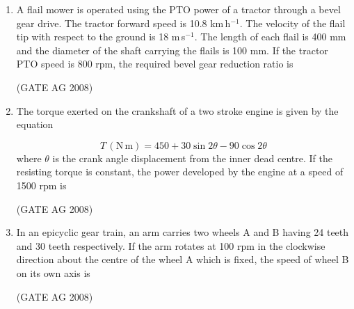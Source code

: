 \documentclass[journal,12pt,onecolumn]{IEEEtran}
\begin{document}
\begin{enumerate}
\medskip

\item 
 A flail mower is operated using the PTO power of a tractor through a bevel gear drive. The tractor forward speed is 10.8 km\,h$^{-1}$. The velocity of the flail tip with respect to the ground is 18 m\,s$^{-1}$. The length of each flail is 400 mm and the diameter of the shaft carrying the flails is 100 mm. If the tractor PTO speed is 800 rpm, the required bevel gear reduction ratio is
\begin{enumerate}
\end{enumerate}
\hfill(GATE AG 2008)\\

\medskip

\item 
 The torque exerted on the crankshaft of a two stroke engine is given by the equation

\[T \, (\mathrm{N\,m}) = 450 + 30 \sin 2\theta - 90 \cos 2\theta\]
where $\theta$ is the crank angle displacement from the inner dead centre. If the resisting torque is constant, the power developed by the engine at a speed of 1500 rpm is
\begin{enumerate}
\end{enumerate}
\hfill(GATE AG 2008)\\

\medskip

\item 
 In an epicyclic gear train, an arm carries two wheels A and B having 24 teeth and 30 teeth respectively. If the arm rotates at 100 rpm in the clockwise direction about the centre of the wheel A which is fixed, the speed of wheel B on its own axis is
\begin{enumerate}
\end{enumerate}
\hfill(GATE AG 2008)\\


\end{enumerate}
\end{document}
